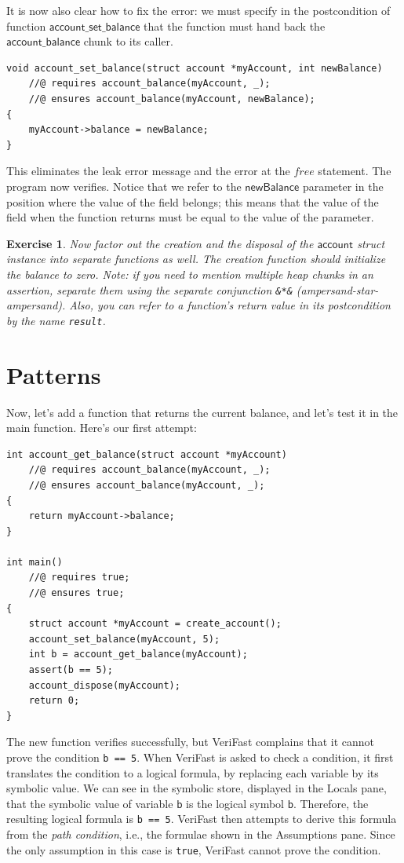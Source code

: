 \documentclass{article}
\newtheorem{exercise}{Exercise}
\begin{document}
It is now also clear how to fix the error: we must specify in
the postcondition of function $\mathsf{account\_set\_balance}$
that the function must hand back the
$\mathsf{account\_balance}$ chunk to its caller.
\begin{lstlisting}
void account_set_balance(struct account *myAccount, int newBalance)
    //@ requires account_balance(myAccount, _);
    //@ ensures account_balance(myAccount, newBalance);
{
    myAccount->balance = newBalance;
}
\end{lstlisting}
 This
eliminates the leak error message and the error at the
$\mathit{free}$ statement. The program now verifies. Notice
that we refer to the $\mathsf{newBalance}$ parameter in the
position where the value of the field belongs; this means that
the value of the field when the function returns must be equal
to the value of the parameter.

\begin{exercise}\label{exercise:account1}
Now factor out the creation and the disposal of the
$\mathsf{account}$ struct instance into separate functions as
well. The creation function should initialize the balance to
zero. Note: if you need to mention multiple heap chunks in an
assertion, separate them using the \emph{separate conjunction}
\lstinline!&*&! (ampersand-star-ampersand). Also, you can refer
to a function's return value in its postcondition by the name
\lstinline!result!.
\end{exercise}

\section{Patterns}

Now, let's add a function that returns the current balance, and
let's test it in the main function. Here's our first attempt:

\begin{lstlisting}
int account_get_balance(struct account *myAccount)
    //@ requires account_balance(myAccount, _);
    //@ ensures account_balance(myAccount, _);
{
    return myAccount->balance;
}

int main()
    //@ requires true;
    //@ ensures true;
{
    struct account *myAccount = create_account();
    account_set_balance(myAccount, 5);
    int b = account_get_balance(myAccount);
    assert(b == 5);
    account_dispose(myAccount);
    return 0;
}
\end{lstlisting}

The new function verifies successfully, but VeriFast complains
that it cannot prove the condition \lstinline!b == 5!. When
VeriFast is asked to check a condition, it first translates the
condition to a logical formula, by replacing each variable by
its symbolic value. We can see in the symbolic store, displayed
in the Locals pane, that the symbolic value of variable
$\mathsf{b}$ is the logical symbol $\mathsf{b}$. Therefore, the
resulting logical formula is \lstinline!b == 5!. VeriFast then
attempts to derive this formula from the \emph{path condition},
i.e., the formulae shown in the Assumptions pane. Since the
only assumption in this case is \lstinline!true!, VeriFast
cannot prove the condition.
\end{document}
